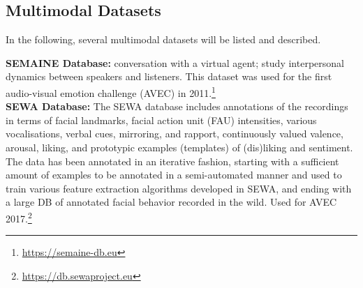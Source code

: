 \begin{comment}
Multimodal behavior signals:\\
\begin{itemize}
    \item Provide a window into internal state \& processes $\rightarrow$ Some overly expressed and directly observable (e.g., vocal and facial expressions, body posture)
$\rightarrow$ Others, covert
(e.g., heart rate, electrodermal response, brain activity) 
    \item Implications for understanding $\rightarrow$ Human information encoding and decoding $\rightarrow$ “Mind-Body” relations
$\rightarrow$ People’s judgment of others behavior
    \item MEASURING \& QUANTIFYING HUMAN BEHAVIOR: A CHALLENGING ENGINEERING PROBLEM
\end{itemize}
\end{comment}

\subsection{Multimodal Datasets}
\label{subsec:multiDatasets}
 In the following, several multimodal datasets will be listed and described.
 
 
\textbf{SEMAINE Database: }
conversation with a virtual agent; study interpersonal dynamics between
speakers and listeners. This dataset was used for the first audio-visual emotion challenge (AVEC) in 2011.\footnote{\url{https://semaine-db.eu}}\\

\textbf{SEWA Database: }
The SEWA database includes annotations of the recordings in terms of facial landmarks, facial action unit (FAU) intensities, various vocalisations, verbal cues, mirroring, and rapport, continuously valued valence, arousal, liking, and prototypic examples (templates) of (dis)liking and sentiment. The data has been annotated in an iterative fashion, starting with a sufficient amount of examples to be annotated in a semi-automated manner and used to train various feature extraction algorithms developed in SEWA, and ending with a large DB of annotated facial behavior recorded in the wild. Used for AVEC 2017.\footnote{\url{https://db.sewaproject.eu}}\\




